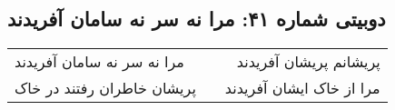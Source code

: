 \begin{center}
\section*{دوبیتی شماره ۴۱: مرا نه سر نه سامان آفریدند}
\label{sec:041}
\begin{longtable}{l p{0.5cm} r}
مرا نه سر نه سامان آفریدند
&&
پریشانم پریشان آفریدند
\\
پریشان خاطران رفتند در خاک
&&
مرا از خاک ایشان آفریدند
\\
\end{longtable}
\end{center}

